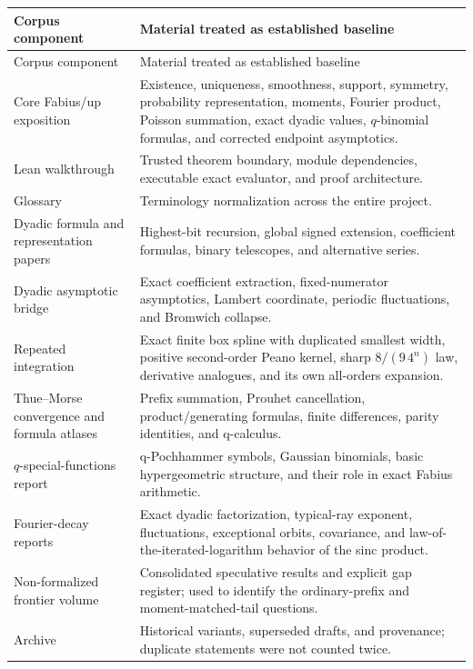 \documentclass[11pt]{article}
\numberwithin{equation}{section}
\theoremstyle{definition}
\theoremstyle{remark}
\begin{document}
\begin{longtable}{@{}p{}p{}@{}}
\toprule
Corpus component & Material treated as established baseline\\
\midrule
\endfirsthead
\toprule
Corpus component & Material treated as established baseline\\
\midrule
\endhead
Core Fabius/up exposition & Existence, uniqueness, smoothness, support, symmetry, probability representation, moments, Fourier product, Poisson summation, exact dyadic values, $q$-binomial formulas, and corrected endpoint asymptotics.\\
Lean walkthrough & Trusted theorem boundary, module dependencies, executable exact evaluator, and proof architecture.\\
Glossary & Terminology normalization across the entire project.\\
Dyadic formula and representation papers & Highest-bit recursion, global signed extension, coefficient formulas, binary telescopes, and alternative series.\\
Dyadic asymptotic bridge & Exact coefficient extraction, fixed-numerator asymptotics, Lambert coordinate, periodic fluctuations, and Bromwich collapse.\\
Repeated integration & Exact finite box spline with duplicated smallest width, positive second-order Peano kernel, sharp $8/(9\,4^n)$ law, derivative analogues, and its own all-orders expansion.\\
Thue--Morse convergence and formula atlases & Prefix summation, Prouhet cancellation, product/generating formulas, finite differences, parity identities, and q-calculus.\\
$q$-special-functions report & q-Pochhammer symbols, Gaussian binomials, basic hypergeometric structure, and their role in exact Fabius arithmetic.\\
Fourier-decay reports & Exact dyadic factorization, typical-ray exponent, fluctuations, exceptional orbits, covariance, and law-of-the-iterated-logarithm behavior of the sinc product.\\
Non-formalized frontier volume & Consolidated speculative results and explicit gap register; used to identify the ordinary-prefix and moment-matched-tail questions.\\
Archive & Historical variants, superseded drafts, and provenance; duplicate statements were not counted twice.\\
\bottomrule
\end{longtable}
\end{document}
